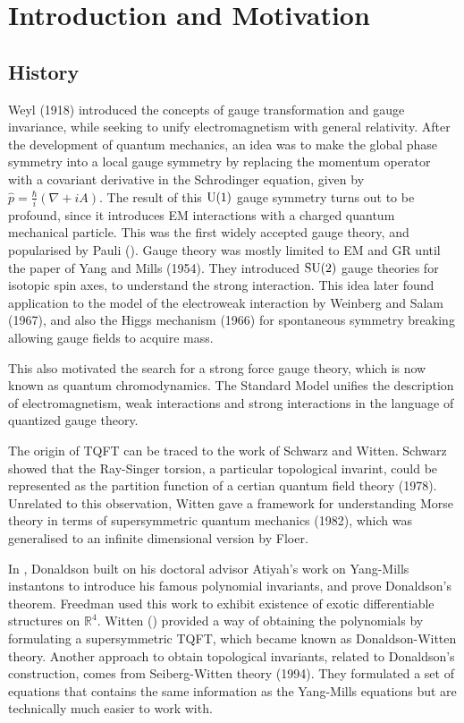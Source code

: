 
\chapter{Introduction and Motivation}
\label{chapter1}
\section{History}
Weyl (1918) introduced the concepts of gauge transformation and gauge
invariance, while seeking to unify electromagnetism with general relativity. After the
development of quantum mechanics, an idea was to make the global phase symmetry
into a local gauge symmetry by replacing the momentum operator with a covariant 
derivative in the Schrodinger equation, given by 
$\widehat{p}=\frac{\hbar}{i}(\nabla+iA)$. The result of this $\operatorname{U}(1)$ gauge symmetry
turns out to be profound, since it introduces EM interactions with a charged
quantum mechanical particle. This was the first widely accepted gauge theory,
and popularised by Pauli (\citeyear{pauli_em}).\cite{pauli_em}
Gauge theory was mostly limited to EM and GR until the paper of Yang and Mills 
(1954). They introduced $\operatorname{SU}(2)$ gauge theories for
isotopic spin axes, to understand the strong interaction. This idea later found
application to the model of the electroweak interaction by Weinberg and Salam
(1967), and also the Higgs mechanism (1966) for spontaneous symmetry breaking
allowing gauge fields to acquire mass. 

This also motivated the search for a strong force gauge theory, which is now
known as quantum chromodynamics. The Standard Model unifies the description of
electromagnetism, weak interactions and strong interactions in the language of
quantized gauge theory. 

The origin of TQFT can be traced to the work of Schwarz and Witten.
Schwarz showed that the Ray-Singer torsion, a particular topological invarint,
could be represented as the partition function of a certian quantum field theory
(1978). Unrelated to this observation, Witten gave a framework for understanding
Morse theory in terms of supersymmetric quantum mechanics (1982), which was 
generalised to an infinite dimensional version by Floer. 

In \citeyear{don83}, Donaldson built on his doctoral advisor Atiyah's work on 
Yang-Mills instantons to introduce his famous polynomial invariants, and prove 
Donaldson's theorem.\cite{don83}
Freedman used this work to exhibit existence of exotic differentiable
structures on $\mathbb{R}^{4}$. 
Witten (\citeyear{wittenTQFT}) provided a way
of obtaining the polynomials by formulating a supersymmetric TQFT, which became
known as Donaldson-Witten theory.\cite{wittenTQFT}
Another approach to obtain topological invariants, related to Donaldson's
construction, comes from Seiberg-Witten theory (1994). They formulated a set of
equations that contains the same information as the Yang-Mills equations but
are technically much easier to work with. 

